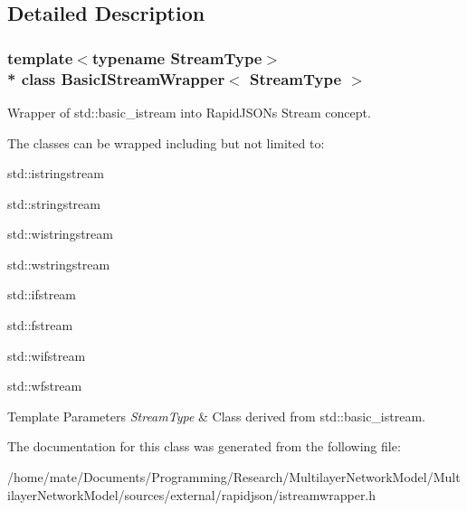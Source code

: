 \subsection{Detailed Description}
\subsubsection*{template$<$typename Stream\+Type$>$\\*
class Basic\+I\+Stream\+Wrapper$<$ Stream\+Type $>$}

Wrapper of {\ttfamily std\+::basic\+\_\+istream} into Rapid\+J\+S\+ON\textquotesingle{}s Stream concept. 

The classes can be wrapped including but not limited to\+:


\begin{DoxyItemize}
\item {\ttfamily std\+::istringstream} 
\item {\ttfamily std\+::stringstream} 
\item {\ttfamily std\+::wistringstream} 
\item {\ttfamily std\+::wstringstream} 
\item {\ttfamily std\+::ifstream} 
\item {\ttfamily std\+::fstream} 
\item {\ttfamily std\+::wifstream} 
\item {\ttfamily std\+::wfstream} 
\end{DoxyItemize}


\begin{DoxyTemplParams}{Template Parameters}
{\em Stream\+Type} & Class derived from {\ttfamily std\+::basic\+\_\+istream}. \\
\hline
\end{DoxyTemplParams}


The documentation for this class was generated from the following file\+:\begin{DoxyCompactItemize}
\item 
/home/mate/\+Documents/\+Programming/\+Research/\+Multilayer\+Network\+Model/\+Multilayer\+Network\+Model/sources/external/rapidjson/istreamwrapper.\+h\end{DoxyCompactItemize}
